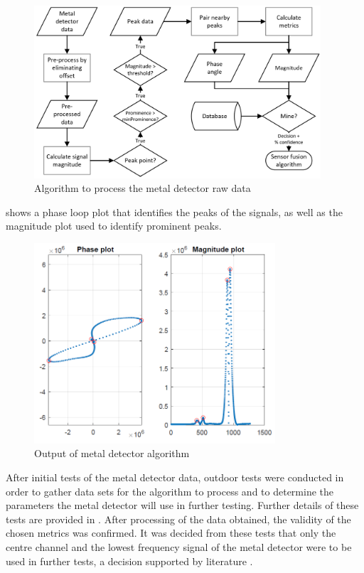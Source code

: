 \documentclass[main.tex]{subfiles}
\begin{document}
\begin{figure}[ht]
\includegraphics[width=0.95\textwidth]{4-DetailedDesign/MDflow.PNG}
\centering
\caption{Algorithm to process the metal detector raw data}
\end{figure}

 shows a phase loop plot that identifies the peaks of the signals, as well as the magnitude plot used to identify prominent peaks.

\begin{figure}[!ht]
\includegraphics[width=0.8\textwidth]{4-DetailedDesign/phase.PNG}
\centering
\caption{Output of metal detector algorithm} 
\end{figure}

After initial tests of the metal detector data, outdoor tests were conducted in order to gather data sets for the algorithm to process and to determine the parameters the metal detector will use in further testing. Further details of these tests are provided in . After processing of the data obtained, the validity of the chosen metrics was confirmed. It was decided from these tests that only the centre channel and the lowest frequency signal of the metal detector were to be used in further tests, a decision supported by literature \parencite{bruschini02}. 
\end{document}
